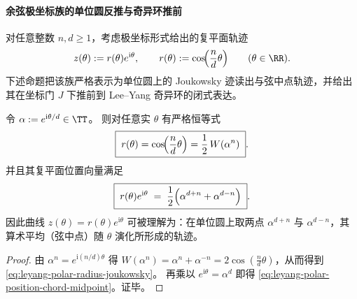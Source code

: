 




\paragraph{余弦极坐标族的单位圆反推与奇异环推前}
对任意整数 \(n,d\ge 1\)，考虑极坐标形式给出的复平面轨迹
\begin{equation}\label{eq:leyang-polar-cos-family}
z(\theta):=r(\theta)e^{\mathrm{i}\theta},\qquad r(\theta):=\cos\!\Bigl(\frac{n}{d}\theta\Bigr)\qquad(\theta\in\RR).
\end{equation}
下述命题把该族严格表示为单位圆上的 Joukowsky 迹读出与弦中点轨迹，并给出其在坐标门 \(J\) 下推前到 Lee--Yang 奇异环的闭式表达。

\begin{proposition}\label{prop:leyang-polar-family-unit-circle-joukowsky}
令 \(\alpha:=e^{\mathrm{i}\theta/d}\in\TT\)。
则对任意实 \(\theta\) 有严格恒等式
\begin{equation}\label{eq:leyang-polar-radius-joukowsky}
\boxed{\;
r(\theta)=\cos\!\Bigl(\frac{n}{d}\theta\Bigr)=\frac12\,W(\alpha^n)\; }.
\end{equation}
并且其复平面位置向量满足
\begin{equation}\label{eq:leyang-polar-position-chord-midpoint}
\boxed{\;
r(\theta)e^{\mathrm{i}\theta}
\;=\;
\frac12\Bigl(\alpha^{d+n}+\alpha^{d-n}\Bigr)\; }.
\end{equation}
因此曲线 \(z(\theta)=r(\theta)e^{\mathrm{i}\theta}\) 可被理解为：在单位圆上取两点 \(\alpha^{d+n}\) 与 \(\alpha^{d-n}\)，其算术平均（弦中点）随 \(\theta\) 演化所形成的轨迹。
\end{proposition}
\begin{proof}
由 \(\alpha^n=e^{\mathrm{i}(n/d)\theta}\) 得
\(
W(\alpha^n)=\alpha^n+\alpha^{-n}=2\cos(\frac{n}{d}\theta)
\)，从而得到 \eqref{eq:leyang-polar-radius-joukowsky}。
再乘以 \(e^{\mathrm{i}\theta}=\alpha^d\) 即得 \eqref{eq:leyang-polar-position-chord-midpoint}。证毕。
\end{proof}



